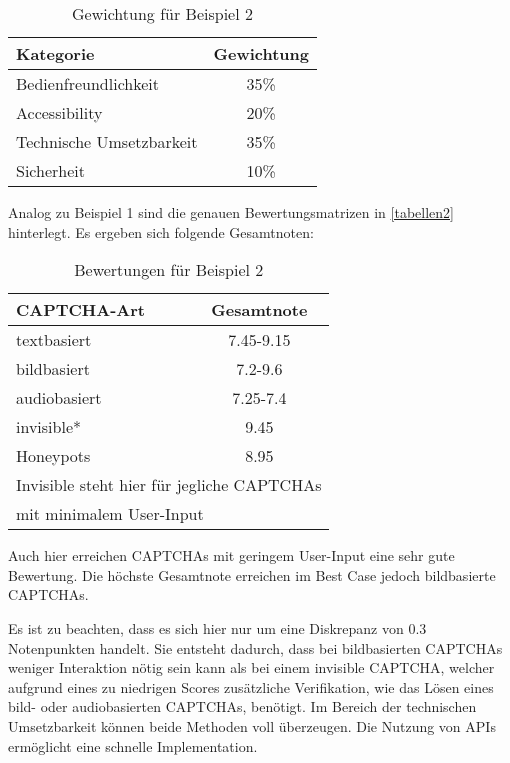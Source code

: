 \begin{table}[h!]
    \caption{Gewichtung für Beispiel 2}
    \begin{center}
        \begin{tabular}{l|c}
            Kategorie                       & Gewichtung \\\hline
            Bedienfreundlichkeit            & 35\%         \\
            Accessibility                   & 20\%        \\
            Technische Umsetzbarkeit        & 35\%         \\
            Sicherheit                      & 10\%         
        \end{tabular}
    \end{center}
\end{table}

Analog zu Beispiel 1 sind die genauen Bewertungsmatrizen in \autoref{tabellen2} hinterlegt.
Es ergeben sich folgende Gesamtnoten:

\begin{table}[h!]
    \caption{Bewertungen für Beispiel 2}
    \begin{center}
        \begin{tabular}{l|c}
            CAPTCHA-Art                       & Gesamtnote \\\hline
            textbasiert            & 7.45-9.15        \\
            bildbasiert                   & 7.2-9.6       \\
            audiobasiert        & 7.25-7.4         \\
            invisible*                      & 9.45         \\
            Honeypots & 8.95 \\
           \multicolumn{2}{l}{\footnotesize * Invisible steht hier für jegliche CAPTCHAs} \\
           \multicolumn{2}{l}{\footnotesize   \enspace mit minimalem User-Input}
        \end{tabular}
    \end{center}
\end{table}

Auch hier erreichen CAPTCHAs mit geringem User-Input eine sehr gute Bewertung.
Die höchste Gesamtnote erreichen im Best Case jedoch bildbasierte CAPTCHAs.

Es ist zu beachten, dass es sich hier nur um eine Diskrepanz von 0.3 Notenpunkten handelt. 
Sie entsteht dadurch, dass bei bildbasierten CAPTCHAs weniger Interaktion nötig sein kann als bei einem invisible CAPTCHA,
welcher aufgrund eines zu niedrigen Scores zusätzliche Verifikation, 
wie das Lösen eines bild- oder audiobasierten CAPTCHAs, benötigt.
Im Bereich der technischen Umsetzbarkeit können beide Methoden voll überzeugen. 
Die Nutzung von APIs ermöglicht eine schnelle Implementation.

